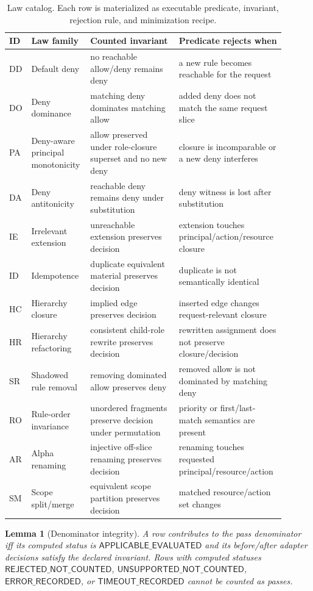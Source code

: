 \documentclass[10pt,conference]{IEEEtran}
\newtheorem{lemma}{Lemma}
\begin{document}
\begin{table}[t]
\centering
\caption{Law catalog.  Each row is materialized as executable predicate, invariant, rejection rule, and minimization recipe.}
\label{tab:relations}
\begin{tabular}{p{0.05\linewidth}p{0.18\linewidth}p{0.31\linewidth}p{0.36\linewidth}}
\toprule
ID & Law family & Counted invariant & Predicate rejects when \\
\midrule
DD & Default deny & no reachable allow/deny remains deny & a new rule becomes reachable for the request \\
DO & Deny dominance & matching deny dominates matching allow & added deny does not match the same request slice \\
PA & Deny-aware principal monotonicity & allow preserved under role-closure superset and no new deny & closure is incomparable or a new deny interferes \\
DA & Deny antitonicity & reachable deny remains deny under substitution & deny witness is lost after substitution \\
IE & Irrelevant extension & unreachable extension preserves decision & extension touches principal/action/resource closure \\
ID & Idempotence & duplicate equivalent material preserves decision & duplicate is not semantically identical \\
HC & Hierarchy closure & implied edge preserves decision & inserted edge changes request-relevant closure \\
HR & Hierarchy refactoring & consistent child-role rewrite preserves decision & rewritten assignment does not preserve closure/decision \\
SR & Shadowed rule removal & removing dominated allow preserves deny & removed allow is not dominated by matching deny \\
RO & Rule-order invariance & unordered fragments preserve decision under permutation & priority or first/last-match semantics are present \\
AR & Alpha renaming & injective off-slice renaming preserves decision & renaming touches requested principal/resource/action \\
SM & Scope split/merge & equivalent scope partition preserves decision & matched resource/action set changes \\
\bottomrule
\end{tabular}
\end{table}

\begin{lemma}[Denominator integrity]
A row contributes to the pass denominator iff its computed status is $\mathsf{APPLICABLE\_EVALUATED}$ and its before/after adapter decisions satisfy the declared invariant.  Rows with computed statuses $\mathsf{REJECTED\_NOT\_COUNTED}$, $\mathsf{UNSUPPORTED\_NOT\_COUNTED}$, $\mathsf{ERROR\_RECORDED}$, or $\mathsf{TIMEOUT\_RECORDED}$ cannot be counted as passes.
\end{lemma}
\end{document}
